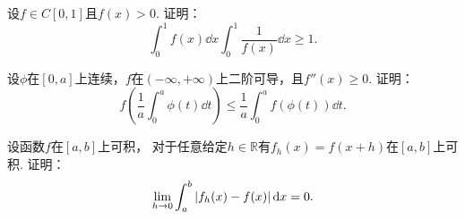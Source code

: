 \begin{example}
设\(f \in C[0,1]\)且\(f(x)>0\).
证明：\begin{equation*}
	\int_0^1 f(x) \dd{x}
	\int_0^1 \frac1{f(x)} \dd{x}
	\geq 1.
\end{equation*}
\end{example}

\begin{example}
设\(\phi\)在\([0,a]\)上连续，\(f\)在\((-\infty,+\infty)\)上二阶可导，且\(f''(x)\geq0\).
证明：\begin{equation*}
	f\left(\frac1a \int_0^a \phi(t) \dd{t}\right)
	\leq \frac1a \int_0^a f(\phi(t)) \dd{t}.
\end{equation*}
\end{example}

\begin{example}
设函数\(f\)在\([a,b]\)上可积，
对于任意给定\(h\in\mathbb{R}\)有\(f_h(x) = f(x+h)\)在\([a,b]\)上可积.
证明：\begin{equation*}
	\lim_{h\to0} \int_a^b \abs{f_h(x)-f(x)} \dd{x} = 0.
\end{equation*}
\end{example}
